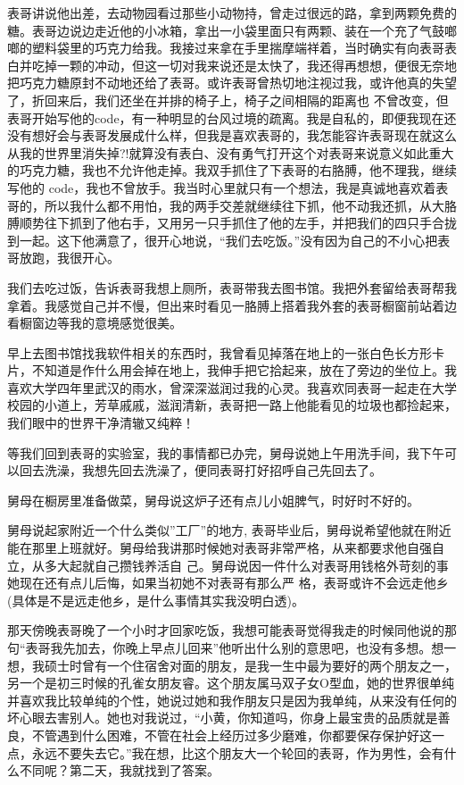 \documentclass[9pt, b5paper]{article}
\begin{document}
表哥讲说他出差，去动物园看过那些小动物持，曾走过很远的路，拿到两颗免费的糖。表哥边说边走近他的小冰箱，拿出一小袋里面只有两颗、装在一个充了气鼓啷啷的塑料袋里的巧克力给我。我接过来拿在手里揣摩端祥着，当时确实有向表哥表白并吃掉一颗的冲动，但这一切对我来说还是太快了，我还得再想想，便很无奈地把巧克力糖原封不动地还给了表哥。或许表哥曾热切地注视过我，或许他真的失望了，折回来后，我们还坐在并排的椅子上，椅子之间相隔的距离也 不曾改变，但表哥开始写他的code，有一种明显的台风过境的疏离。我是自私的，即便我现在还没有想好会与表哥发展成什么样，但我是喜欢表哥的，我怎能容许表哥现在就这么从我的世界里消失掉?!就算没有表白、没有勇气打开这个对表哥来说意义如此重大的巧克力糖，我也不允许他走掉。我双手抓住了下表哥的右胳膊，他不理我，继续写他的 code，我也不曾放手。我当时心里就只有一个想法，我是真诚地喜欢着表哥的，所以我什么都不用怕，我的两手交差就继续往下抓，他不动我还抓，从大胳膊顺势往下抓到了他右手，又用另一只手抓住了他的左手，并把我们的四只手合拢到一起。这下他满意了，很开心地说，“我们去吃饭。”没有因为自己的不小心把表哥放跑，我很开心。

我们去吃过饭，告诉表哥我想上厕所，表哥带我去图书馆。我把外套留给表哥帮我拿着。我感觉自己并不慢，但出来时看见一胳膊上搭着我外套的表哥橱窗前站着边看橱窗边等我的意境感觉很美。

早上去图书馆找我软件相关的东西时，我曾看见掉落在地上的一张白色长方形卡片，不知道是作什么用会掉在地上，我伸手把它拾起来，放在了旁边的坐位上。我喜欢大学四年里武汉的雨水，曾深深滋润过我的心灵。我喜欢同表哥一起走在大学校园的小道上，芳草戚戚，滋润清新，表哥把一路上他能看见的垃圾也都捡起来，我们眼中的世界干净清辙又纯粹！

等我们回到表哥的实验室，我的事情都已办完，舅母说她上午用洗手间，我下午可以回去洗澡，我想先回去洗澡了，便同表哥打好招呼自己先回去了。 

舅母在橱房里准备做菜，舅母说这炉子还有点儿小姐脾气，时好时不好的。

舅母说起家附近一个什么类似”工厂”的地方, 表哥毕业后，舅母说希望他就在附近能在那里上班就好。舅母给我讲那时候她对表哥非常严格，从来都要求他自强自立，从多大起就自己攒钱养活自 己。舅母说因一件什么对表哥用钱格外苛刻的事她现在还有点儿后悔，如果当初她不对表哥有那么严 格，表哥或许不会远走他乡(具体是不是远走他乡，是什么事情其实我没明白透)。

那天傍晚表哥晚了一个小时才回家吃饭，我想可能表哥觉得我走的时候同他说的那句“表哥我先加去，你晚上早点儿回来”他听出什么别的意思吧，也没有多想。想一想，我硕士时曾有一个住宿舍对面的朋友，是我一生中最为要好的两个朋友之一，另一个是初三时候的孔雀女朋友睿。这个朋友属马双子女O型血，她的世界很单纯并喜欢我比较单纯的个性，她说过她和我作朋友只是因为我单纯，从来没有任何的坏心眼去害别人。她也对我说过，“小黄，你知道吗，你身上最宝贵的品质就是善良，不管遇到什么困难，不管在社会上经历过多少磨难，你都要保存保护好这一点，永远不要失去它。”我在想，比这个朋友大一个轮回的表哥，作为男性，会有什么不同呢？第二天，我就找到了答案。
\end{document}
